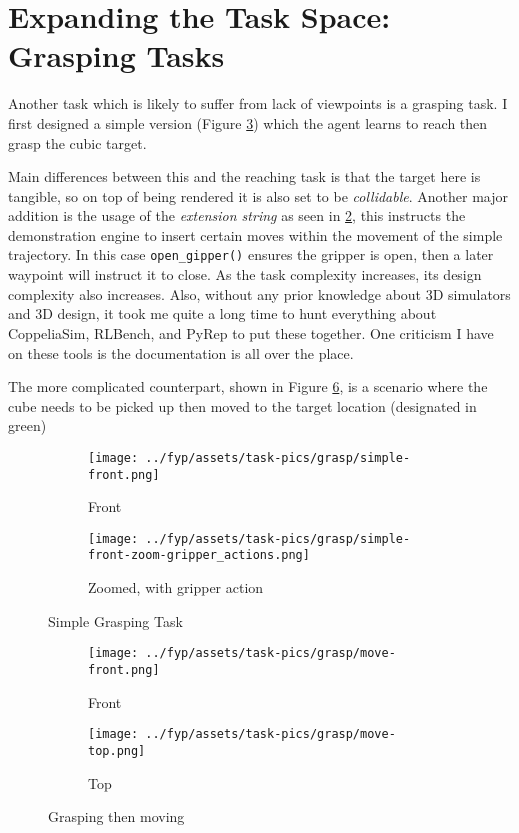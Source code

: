 \section{Expanding the Task Space: Grasping Tasks}
Another task which is likely to suffer from lack of viewpoints is a grasping task. I first designed
a simple version (Figure \ref{fig:grasp-simple}) which the agent learns to reach then grasp the cubic target. 

Main differences between this and the reaching task is that the target here is tangible, so on top of being rendered it is also set to be \emph{collidable}. Another major addition is the usage of the \emph{extension string} as seen in \ref{subfig:simple-zoom-actions}, this instructs the demonstration engine to insert certain moves within the movement of the simple trajectory. In this case \verb|open_gipper()| ensures the gripper is open, then a later waypoint will instruct it to close. As the task complexity increases, its design complexity also increases. Also, without any prior knowledge about 3D simulators and 3D design, it took me quite a long time to hunt everything about CoppeliaSim, RLBench, and PyRep to put these together. One criticism I have on these tools is the documentation is all over the place. 

The more complicated counterpart, shown in Figure \ref{fig:grasp-move}, is a scenario where the cube needs to be picked up then moved to the target location (designated in green)

\begin{figure}[htpb] %
  \centering
  \begin{subfigure}{0.3\linewidth}
    \centering
    \texttt{[image: ../fyp/assets/task-pics/grasp/simple-front.png]}
    \caption{Front}\label{subfig:simple-front}
  \end{subfigure}
  \hfill
  \begin{subfigure}{0.5\linewidth}
    \centering
    \texttt{[image: ../fyp/assets/task-pics/grasp/simple-front-zoom-gripper\_actions.png]}
    \caption{Zoomed, with gripper action}\label{subfig:simple-zoom-actions}
  \end{subfigure}
  \caption{Simple Grasping Task}\label{fig:grasp-simple}
\end{figure}

\begin{figure}[htpb] %
  \centering
  \begin{subfigure}{0.45\linewidth}
    \centering
    \texttt{[image: ../fyp/assets/task-pics/grasp/move-front.png]} 
    \caption{Front}\label{subfig:grasp-move-front}
  \end{subfigure}
  \hfill
  \begin{subfigure}{0.45\linewidth}
    \centering
    \texttt{[image: ../fyp/assets/task-pics/grasp/move-top.png]}
    \caption{Top}\label{subfig:grasp-move-top}
  \end{subfigure}
  \caption{Grasping then moving}\label{fig:grasp-move}
\end{figure}


